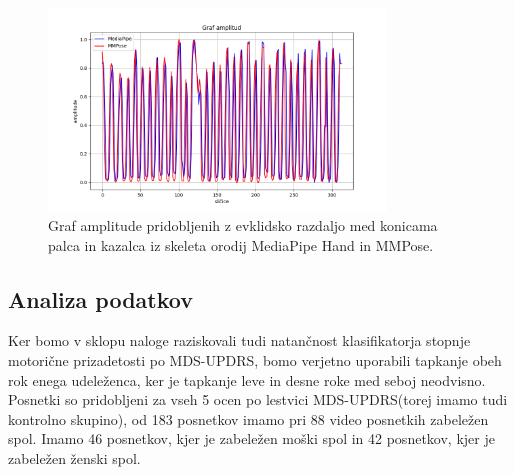 \documentclass[a4paper,12pt]{article}
\begin{document}
\begin{figure}[H]
  \centering
  \includegraphics[width=0.8\textwidth]{slike/distances_plot_both.png}  
  \caption{Graf amplitude pridobljenih z evklidsko razdaljo med konicama palca in kazalca iz skeleta orodij MediaPipe Hand in MMPose.}
  \label{fig:amplituda_oba}
\end{figure}


\subsection{Analiza podatkov}

Ker bomo v sklopu naloge raziskovali tudi natančnost klasifikatorja stopnje motorične prizadetosti po MDS-UPDRS, 
bomo verjetno uporabili tapkanje obeh rok enega udeleženca, ker je tapkanje leve in desne roke med seboj neodvisno.\\

Posnetki so pridobljeni za vseh 5 ocen po lestvici MDS-UPDRS(torej imamo tudi kontrolno skupino), od 183 posnetkov 
imamo pri 88 video posnetkih zabeležen spol. Imamo 46 posnetkov, kjer je zabeležen moški spol in 42 posnetkov, kjer
je zabeležen ženski spol.
\end{document}
